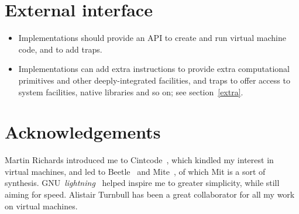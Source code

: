 \documentclass[a4paper]{article}
\begin{document}
\section{External interface}

\begin{itemize}
\item Implementations should provide an API to create and run virtual machine code, and to add traps.
\item Implementations can add extra instructions to provide extra computational primitives and other deeply-integrated facilities, and traps to offer access to system facilities, native libraries and so on; see section~\ref{extra}.
\end{itemize}


\section*{Acknowledgements}

Martin Richards introduced me to Cintcode~\cite{cintweb}, which
kindled my interest in virtual machines, and led to
Beetle~\cite{beetledis} and Mite~\cite{mite0},
of which Mit is a sort of synthesis.
GNU~\emph{lightning}~\cite{lightning} helped inspire me to greater
simplicity, while still aiming for speed. Alistair Turnbull
has been a great collaborator for all my work on virtual machines.



\end{document}
